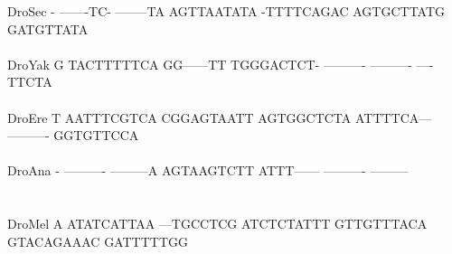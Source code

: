 \documentclass[11pt,twoside,reqno,a4paper]{article}
\begin{document}
{DroSec	-	-------TC-	--------TA	AGTTAATATA	-TTTTCAGAC	AGTGCTTATG	GATGTTATA\\
\hspace*{7\charwidth}\hspace*{1\charwidth}\hspace*{1\charwidth}\hspace*{1\charwidth}\hspace*{1\charwidth}\hspace*{1\charwidth}\hspace*{1\charwidth}\\
DroYak	G	TACTTTTTCA	GG------TT	TGGGACTCT-	----------	----------	----TTCTA\\
\hspace*{7\charwidth}\hspace*{1\charwidth}\hspace*{1\charwidth}\hspace*{1\charwidth}\hspace*{1\charwidth}\hspace*{1\charwidth}\hspace*{1\charwidth}\\
DroEre	T	AATTTCGTCA	CGGAGTAATT	AGTGGCTCTA	ATTTTCA---	----------	GGTGTTCCA\\
\hspace*{7\charwidth}\hspace*{1\charwidth}\hspace*{1\charwidth}\hspace*{1\charwidth}\hspace*{1\charwidth}\hspace*{1\charwidth}\hspace*{1\charwidth}\\
DroAna	-	----------	---------A	AGTAAGTCTT	ATTT------	----------	---------\\
\hspace*{7\charwidth}\hspace*{1\charwidth}\hspace*{1\charwidth}\hspace*{1\charwidth}\hspace*{1\charwidth}\hspace*{1\charwidth}\hspace*{1\charwidth}\\
\\
DroMel	A	ATATCATTAA	---TGCCTCG	ATCTCTATTT	GTTGTTTACA	GTACAGAAAC	GATTTTTGG\\
\hspace*{7\charwidth}\hspace*{1\charwidth}\hspace*{1\charwidth}\hspace*{1\charwidth}\hspace*{1\charwidth}\hspace*{1\charwidth}\hspace*{1\charwidth}\\
}
\end{document}
